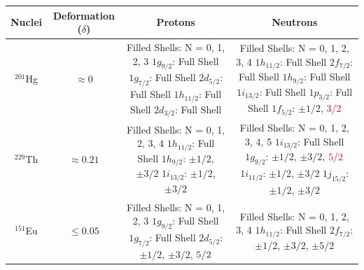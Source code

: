\documentclass[10pt,a4paper, twoside]{report}
\begin{document}
\begin{table}[htbp]
\centering
\begin{tabular}{c|c|c|c}
\toprule
\toprule
Nuclei     & Deformation ($\delta$) & Protons & Neutrons \\
\midrule
$^{201}$Hg & $\approx 0$
    &  \pbox{20cm}{Filled Shells: N = 0, 1, 2, 3 \\
    $1g_{9/2}$: Full Shell \\
    $1g_{7/2}$: Full Shell \\
    $2d_{5/2}$: Full Shell \\
    $1h_{11/2}$: Full Shell \\
    $2d_{3/2}$: Full Shell}              
    &  \pbox{20cm}{Filled Shells: N = 0, 1, 2, 3, 4 \\
    $1h_{11/2}$: Full Shell \\
    $2f_{7/2}$: Full Shell \\
    $1h_{9/2}$: Full Shell \\
    $1i_{13/2}$: Full Shell \\
    $1p_{3/2}$: Full Shell \\
    $1f_{5/2}$: $\pm 1/2$, \textcolor{red}{3/2}} \\
\midrule
$^{229}$Th & $\approx 0.21$
    &  \pbox{20cm}{Filled Shells: N = 0, 1, 2, 3, 4 \\
    $1h_{11/2}$: Full Shell \\
    $1h_{9/2}$: $\pm 1/2$, $\pm 3/2$ \\
    $1i_{13/2}$: $\pm 1/2$, $\pm 3/2$}              
    &  \pbox{20cm}{Filled Shells: N = 0, 1, 2, 3, 4, 5 \\
    $1i_{13/2}$: Full Shell \\
    $1g_{9/2}$: $\pm 1/2$, $\pm 3/2$, $\textcolor{red}{5/2}$ \\
    $1i_{11/2}$: $\pm 1/2$, $\pm 3/2$ \\
    $1j_{15/2}$: $\pm 1/2$, $\pm 3/2$} \\
\midrule
$^{151}$Eu & $\leq 0.05$
    &  \pbox{20cm}{Filled Shells: N = 0, 1, 2, 3 \\
    $1g_{9/2}$: Full Shell \\
    $1g_{7/2}$: Full Shell \\
    $2d_{5/2}$: $\pm 1/2$, $\pm 3/2$, $\textcolor{blue}{5/2}$ }          
    &  \pbox{20cm}{Filled Shells: N = 0, 1, 2, 3, 4 \\
    $1h_{11/2}$: Full Shell \\
    $2f_{7/2}$:$\pm 1/2$, $\pm 3/2$, $\pm 5/2$} \\

\end{tabular}
\end{table}
\end{document}
